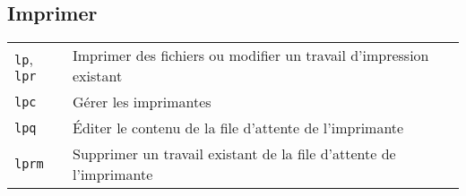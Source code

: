 \documentclass[10pt,a4paper]{article}
\begin{document}
\begin{multicols}{2}
\section{Imprimer}
\begin{tabular}{ p{2.5cm} p{8.5cm} }
  \hline
  \texttt{lp}, \texttt{lpr} & Imprimer des fichiers ou modifier un travail \newline d'impression existant\\
  \rowcolor{Gray}
  \texttt{lpc} & Gérer les imprimantes \\
  \texttt{lpq} & Éditer le contenu de la file d'attente de l'imprimante\\
  \rowcolor{Gray}
  \texttt{lprm} & Supprimer un travail existant de la file d'attente de l'imprimante \\
  \hline
\end{tabular}




\end{multicols}

\newpage

\cheatsheet
\end{document}
